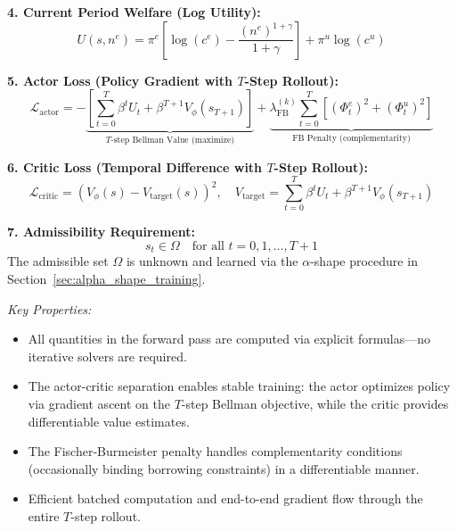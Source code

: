 \begin{center}
{{\vspace{0.3em}
\textbf{4. Current Period Welfare (Log Utility):}
\begin{equation}
    U(s, n^e) = \pi^e \left[ \log(c^e) - \frac{(n^e)^{1+\gamma}}{1+\gamma} \right] + \pi^u \log(c^u)
\end{equation}

\vspace{0.3em}
\textbf{5. Actor Loss (Policy Gradient with $T$-Step Rollout):}
\begin{equation}
    \mathcal{L}_{\text{actor}} = -\underbrace{\left[ \sum_{t=0}^{T} \beta^t U_t + \beta^{T+1} V_\phi(s_{T+1}) \right]}_{\text{$T$-step Bellman Value (maximize)}} + \underbrace{\lambda_{\text{FB}}^{(k)} \sum_{t=0}^{T} \left[ (\Phi^e_t)^2 + (\Phi^u_t)^2 \right]}_{\text{FB Penalty (complementarity)}}
\end{equation}

\vspace{0.3em}
\textbf{6. Critic Loss (Temporal Difference with $T$-Step Rollout):}
\begin{equation}
    \mathcal{L}_{\text{critic}} = \left( V_\phi(s) - V_{\text{target}}(s) \right)^2, \quad V_{\text{target}} = \sum_{t=0}^{T} \beta^t U_t + \beta^{T+1} V_\phi(s_{T+1})
\end{equation}

\vspace{0.3em}
\textbf{7. Admissibility Requirement:}
\begin{equation}
    s_t \in \Omega \quad \text{for all } t = 0, 1, \ldots, T+1
\end{equation}
The admissible set $\Omega$ is unknown and learned via the $\alpha$-shape procedure in Section~\ref{sec:alpha_shape_training}.
}}
\end{center}

\vspace{0.5em}
\textit{Key Properties:}
\begin{itemize}
    \item All quantities in the forward pass are computed via explicit formulas---no iterative solvers are required.
    \item The actor-critic separation enables stable training: the actor optimizes policy via gradient ascent on the $T$-step Bellman objective, while the critic provides differentiable value estimates.
    \item The Fischer-Burmeister penalty handles complementarity conditions (occasionally binding borrowing constraints) in a differentiable manner.
    \item Efficient batched computation and end-to-end gradient flow through the entire $T$-step rollout.
\end{itemize}


